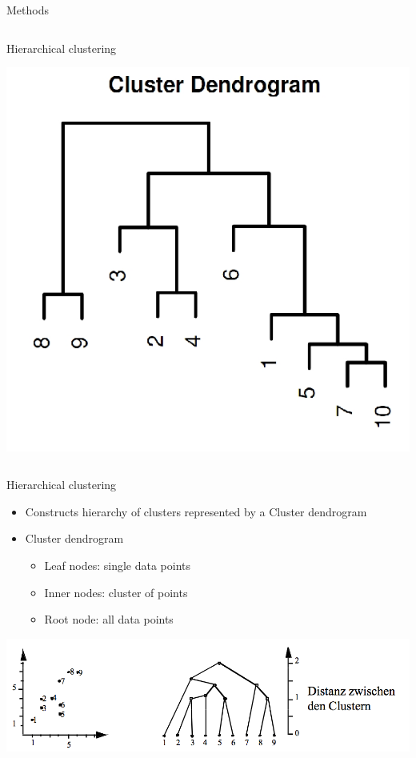 \documentclass{beamer}\usepackage[]{graphicx}\usepackage[]{color}
\begin{document}
\begin{frame}[fragile]{Methods}
\begin{columns}[t]
\begin{column}{.32\linewidth}
\begin{block}{Hierarchical clustering}
{\begin{center}
          \includegraphics[width=.7\linewidth]{clust_hier.png}
        \end{center}}
      \end{block}
    \end{column}
  \end{columns}
\end{frame}

\begin{frame}[fragile]{Hierarchical clustering}
  \begin{itemize}
    \item Constructs hierarchy of clusters represented by a \alert{Cluster dendrogram}
    \item \alert{Cluster dendrogram}
      \begin{itemize}
        \item Leaf nodes: single data points
        \item Inner nodes: cluster of points
        \item Root node: all data points
      \end{itemize}
  \end{itemize}
  \begin{center}
    \includegraphics[width=.8\linewidth]{clust_dendro.png}
  \end{center}
\end{frame}
\end{document}
